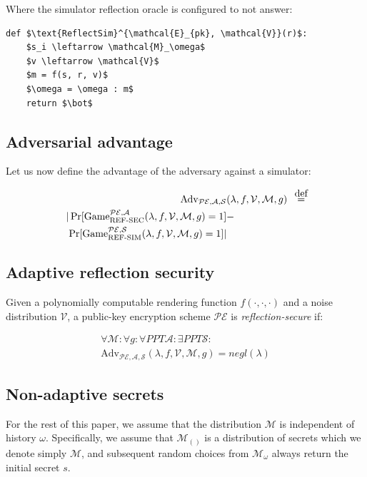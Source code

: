 \documentclass{sig-alternate-05-2015}
\newcommand\defeq{\stackrel{\mathclap{\normalfont\mbox{def}}}{=}}
\begin{document}
Where the simulator reflection oracle is configured to not answer:

\begin{lstlisting}[texcl,mathescape]
def $\text{ReflectSim}^{\mathcal{E}_{pk}, \mathcal{V}}(r)$:
    $s_i \leftarrow \mathcal{M}_\omega$
    $v \leftarrow \mathcal{V}$
    $m = f(s, r, v)$
    $\omega = \omega : m$
    return $\bot$
\end{lstlisting}

\subsection{Adversarial advantage}\label{subsec:refsecadv}

Let us now define the advantage of the adversary against a simulator:

\begin{align*}
    \text{Adv}_{\mathcal{PE}, \mathcal{A}, \mathcal{S}}&(\lambda, f, \mathcal{V}, \mathcal{M}, g) &\defeq\\
    |\Pr[\text{Game}_{\text{REF-SEC}}^{\mathcal{PE},\mathcal{A}}(\lambda, f, \mathcal{V}, \mathcal{M}, g) = 1] &-\\
    \Pr[\text{Game}_{\text{REF-SIM}}^{\mathcal{PE},\mathcal{S}}(\lambda, f, \mathcal{V}, \mathcal{M}, g) = 1]| &
\end{align*}

\subsection{Adaptive reflection security}\label{subsec:adaptiverefsec}

Given a polynomially computable rendering function $f(\cdot, \cdot, \cdot)$ and
a  noise distribution $\mathcal{V}$, a public-key encryption scheme
$\mathcal{PE}$ is \textit{reflection-secure} if:

\begin{align*}
\forall \mathcal{M}:
\forall g:
\forall PPT \mathcal{A}:
\exists PPT \mathcal{S}:\\
\text{Adv}_{\mathcal{PE}, \mathcal{A}, \mathcal{S}}(\lambda, f, \mathcal{V}, \mathcal{M}, g) = negl(\lambda)
\end{align*}

\subsection{Non-adaptive secrets}\label{subsec:refsecnonadapt}

For the rest of this paper, we assume that the distribution $\mathcal{M}$ is
independent of history $\omega$. Specifically, we assume that $\mathcal{M}_{()}$
is a distribution of secrets which we denote simply $\mathcal{M}$, and subsequent
random choices from $\mathcal{M}_\omega$ always return the initial secret $s$.
\end{document}
